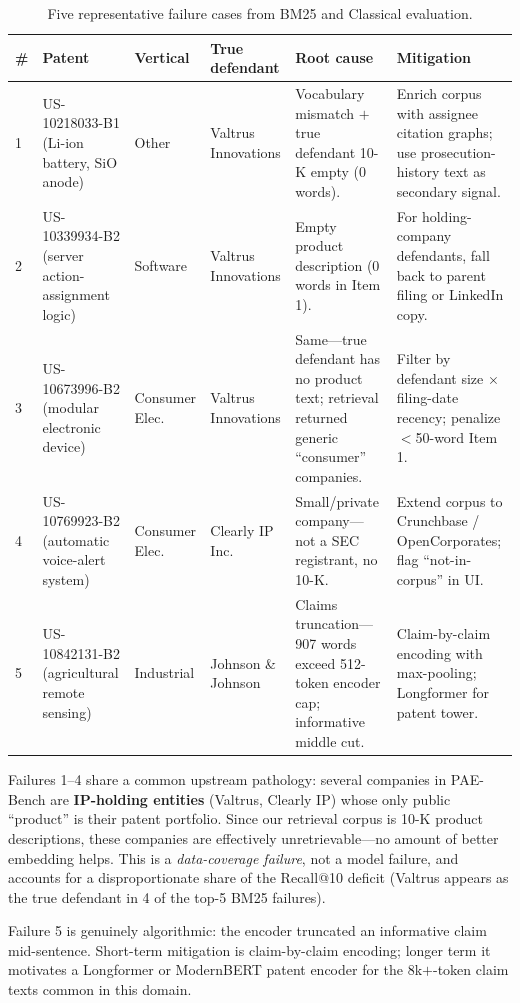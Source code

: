 \documentclass[11pt]{article}
\begin{document}
\begin{table}[h]
\centering
\caption{Five representative failure cases from BM25 and Classical evaluation.}
\label{tab:errors}
\small
\begin{tabular}{p{0.25cm}p{2.2cm}p{1.9cm}p{2.2cm}p{2.8cm}p{3.5cm}}
\toprule
\# & \textbf{Patent} & \textbf{Vertical} & \textbf{True defendant} & \textbf{Root cause} & \textbf{Mitigation} \\
\midrule
1 & US-10218033-B1 (Li-ion battery, SiO anode) & Other & Valtrus Innovations & Vocabulary mismatch $+$ true defendant 10-K empty (0 words). & Enrich corpus with assignee citation graphs; use prosecution-history text as secondary signal. \\
2 & US-10339934-B2 (server action-assignment logic) & Software & Valtrus Innovations & Empty product description (0 words in Item 1). & For holding-company defendants, fall back to parent filing or LinkedIn copy. \\
3 & US-10673996-B2 (modular electronic device) & Consumer Elec. & Valtrus Innovations & Same---true defendant has no product text; retrieval returned generic ``consumer'' companies. & Filter by defendant size $\times$ filing-date recency; penalize $<$50-word Item 1. \\
4 & US-10769923-B2 (automatic voice-alert system) & Consumer Elec. & Clearly IP Inc. & Small/private company---not a SEC registrant, no 10-K. & Extend corpus to Crunchbase / OpenCorporates; flag ``not-in-corpus'' in UI. \\
5 & US-10842131-B2 (agricultural remote sensing) & Industrial & Johnson \& Johnson & Claims truncation---907 words exceed 512-token encoder cap; informative middle cut. & Claim-by-claim encoding with max-pooling; Longformer for patent tower. \\
\bottomrule
\end{tabular}
\end{table}

Failures 1--4 share a common upstream pathology: several companies in PAE-Bench are \textbf{IP-holding entities} (Valtrus, Clearly IP) whose only public ``product'' is their patent portfolio. Since our retrieval corpus is 10-K product descriptions, these companies are effectively unretrievable---no amount of better embedding helps. This is a \emph{data-coverage failure}, not a model failure, and accounts for a disproportionate share of the Recall@10 deficit (Valtrus appears as the true defendant in 4 of the top-5 BM25 failures).

Failure 5 is genuinely algorithmic: the encoder truncated an informative claim mid-sentence. Short-term mitigation is claim-by-claim encoding; longer term it motivates a Longformer or ModernBERT patent encoder for the 8k$+$-token claim texts common in this domain.
\end{document}
